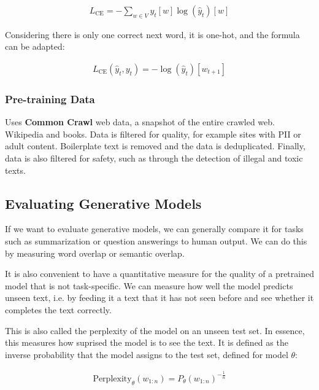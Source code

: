 \begin{definition}
  \begin{align*}
    L_\text{CE} = - \sum_{w \in V} y_t [w] \log(\hat{y}_t) [w]
  \end{align*}

  Considering there is only one correct next word, it is one-hot, and
  the formula can be adapted:

  \begin{align*}
    L_\text{CE}(\hat{y}_t, y_t) = -\log(\hat{y}_t) [w_{t+1}]
  \end{align*}
\end{definition}

\subsubsection{Pre-training Data}

Uses \textbf{Common Crawl} web data, a snapshot of the entire crawled
web. Wikipedia and books.
Data is filtered for quality, for example sites with PII or adult
content. Boilerplate text is removed and
the data is deduplicated. Finally, data is also filtered for safety,
such as through the detection of illegal and toxic texts.

\subsection{Evaluating Generative Models}

If we want to evaluate generative models, we can generally compare it for
tasks such as summarization or question answerings to human output.
We can do this
by measuring word overlap or semantic overlap.

It is also convenient to have a quantitative measure for the quality of
a pretrained model that is not task-specific. We can measure how well the
model predicts unseen text, i.e. by feeding it a text that it has not seen
before and see whether it completes the text correctly.

This is also called the perplexity of the model on an unseen test
set. In essence, this measures how suprised the model is to see the text.
It is defined as the inverse probability that the model assigns to the test set,
defined for model $\theta$:

\begin{definition}[Perplexity]
  \begin{align*}
    \text{Perplexity}_\theta(w_{1:n}) = P_\theta(w_{1:n})^{-\frac{1}{n}}
  \end{align*}
\end{definition}

